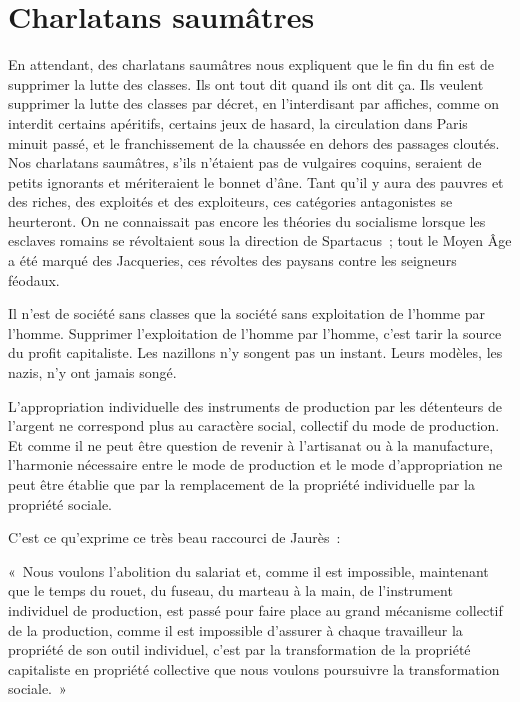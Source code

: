 \documentclass[french,twoside]{book} %
\newenvironment{quoteblock}%
  {\begin{quoting}}
  {\end{quoting}}
\newenvironment{quotebar}{%
    \def\FrameCommand{{\color{rubric!10!}\vrule width 0.5em} \hspace{0.9em}}%
    \def\OuterFrameSep{\itemsep} %
    \MakeFramed {\advance\hsize-\width \FrameRestore}
  }%
  {%
    \endMakeFramed
  }
\renewenvironment{quoteblock}%
  {%
    \savenotes
    \setstretch{0.9}
    \normalfont
    \begin{quotebar}
  }
  {%
    \end{quotebar}
    \spewnotes
  }
\begin{document}
\section[{Charlatans saumâtres}]{Charlatans saumâtres}
\noindent En attendant, des charlatans saumâtres nous expliquent que le fin du fin est de supprimer la lutte des classes. Ils ont tout dit quand ils ont dit ça. Ils veulent supprimer la lutte des classes par décret, en l’interdisant par affiches, comme on interdit certains apéritifs, certains jeux de hasard, la circulation dans Paris minuit passé, et le franchissement de la chaussée en dehors des passages cloutés. Nos charlatans saumâtres, s’ils n’étaient pas de vulgaires coquins, seraient de petits ignorants et mériteraient le bonnet d’âne. Tant qu’il y aura des pauvres et des riches, des exploités et des exploiteurs, ces catégories antagonistes se heurteront. On ne connaissait pas encore les théories du socialisme lorsque les esclaves romains se révoltaient sous la direction de Spartacus ; tout le Moyen Âge a été marqué des Jacqueries, ces révoltes des paysans contre les seigneurs féodaux.\par
Il n’est de société sans classes que la société sans exploitation de l’homme par l’homme. Supprimer l’exploitation de l’homme par l’homme, c’est tarir la source du profit capitaliste.   Les nazillons n’y songent pas un instant. Leurs modèles, les nazis, n’y ont jamais songé.\par
L’appropriation individuelle des instruments de production par les détenteurs de l’argent ne correspond plus au caractère social, collectif du mode de production. Et comme il ne peut être question de revenir à l’artisanat ou à la manufacture, l’harmonie nécessaire entre le mode de production et le mode d’appropriation ne peut être établie que par la remplacement de la propriété individuelle par la propriété sociale.\par
C’est ce qu’exprime ce très beau raccourci de Jaurès :\par

\begin{quoteblock}
 \noindent « Nous voulons l’abolition du salariat et, comme il est impossible, maintenant que le temps du rouet, du fuseau, du marteau à la main, de l’instrument individuel de production, est passé pour faire place au grand mécanisme collectif de la production, comme il est impossible d’assurer à chaque travailleur la propriété de son outil individuel, c’est par la transformation de la propriété capitaliste en propriété collective que nous voulons poursuivre la transformation sociale. »
 \end{quoteblock}
\end{document}
